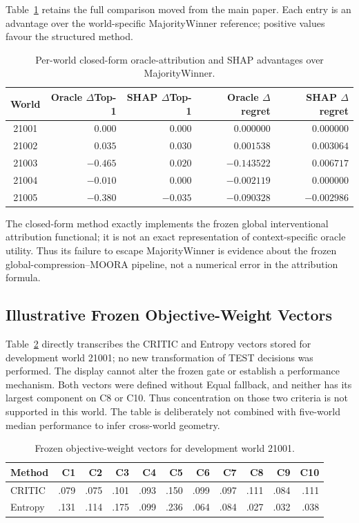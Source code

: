 \documentclass[runningheads]{llncs}
\begin{document}
Table~\ref{supp:tab:pilotboracleshap} retains the full comparison moved from the main paper.
Each entry is an advantage over the world-specific MajorityWinner reference; positive values
favour the structured method.

\begin{table}[t]
\centering
\caption{Per-world closed-form oracle-attribution and SHAP advantages over MajorityWinner.}
\label{supp:tab:pilotboracleshap}
\small
\begin{tabular}{@{}crrrr@{}}
\toprule
World & Oracle $\Delta$Top-1 & SHAP $\Delta$Top-1 & Oracle $\Delta$regret & SHAP $\Delta$regret\\
\midrule
21001 & $ 0.000$ & $ 0.000$ & $ 0.000000$ & $ 0.000000$\\
21002 & $ 0.035$ & $ 0.030$ & $ 0.001538$ & $ 0.003064$\\
21003 & $-0.465$ & $ 0.020$ & $-0.143522$ & $ 0.006717$\\
21004 & $-0.010$ & $ 0.000$ & $-0.002119$ & $ 0.000000$\\
21005 & $-0.380$ & $-0.035$ & $-0.090328$ & $-0.002986$\\
\bottomrule
\end{tabular}
\end{table}

The closed-form method exactly implements the frozen global interventional attribution
functional; it is not an exact representation of context-specific oracle utility. Thus its
failure to escape MajorityWinner is evidence about the frozen global-compression--MOORA
pipeline, not a numerical error in the attribution formula.

\subsection{Illustrative Frozen Objective-Weight Vectors}

Table~\ref{supp:tab:objectivevectors} directly transcribes the CRITIC and Entropy vectors stored
for development world 21001; no new transformation of TEST decisions was performed. The display
cannot alter the frozen gate or establish a performance mechanism. Both vectors were defined
without Equal fallback, and neither has its largest component on C8 or C10. Thus concentration
on those two criteria is not supported in this world. The table is deliberately not combined
with five-world median performance to infer cross-world geometry.

\begin{table}[t]
\centering
\caption{Frozen objective-weight vectors for development world 21001.}
\label{supp:tab:objectivevectors}
\scriptsize
\setlength{\tabcolsep}{2.8pt}
\begin{tabular}{@{}lrrrrrrrrrr@{}}
\toprule
Method & C1 & C2 & C3 & C4 & C5 & C6 & C7 & C8 & C9 & C10\\
\midrule
CRITIC & .079 & .075 & .101 & .093 & .150 & .099 & .097 & .111 & .084 & .111\\
Entropy & .131 & .114 & .175 & .099 & .236 & .064 & .084 & .027 & .032 & .038\\
\bottomrule
\end{tabular}
\end{table}
\end{document}
